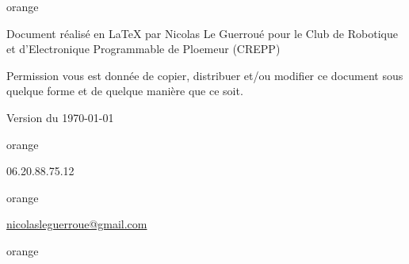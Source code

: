 
\begin{items}{orange}{\Triangle}
\item Document réalisé en \LaTeX{} par Nicolas Le Guerroué 
pour le Club de Robotique et d'Electronique Programmable de Ploemeur (CREPP) 
\item Permission vous est donnée de copier, distribuer et/ou modifier ce document sous quelque forme et de quelque manière que ce soit.
\item Version du \today
\end{items}


\begin{items}{orange}{\faPhone}
    \item 06.20.88.75.12
\end{items}

\begin{items}{orange}{\faEnvelope}
    \item \href{mailto:nicolasleguerroue@gmail.com}{nicolasleguerroue@gmail.com}
\end{items}

\begin{items}{orange}{\Triangle}
    \item {}
\end{items}

